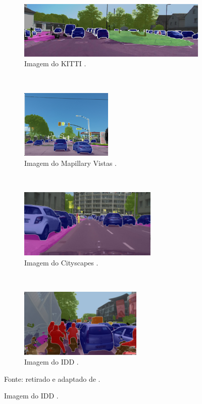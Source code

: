 \begin{figure}[H]
   \caption{Imagens de conjuntos de dados de segmentação panóptica.}
   \centering
   \label{panoptic:fig:3}
    \begin{subfigure}[t]{0.40\textwidth}
        \centering
        \includegraphics[width=1\linewidth]{recursos/imagens/panoptic/kitti.jpg}
        \caption{Imagem do KITTI \cite{Geiger2013}.}
        \label{panoptic:fig:3.1}
    \end{subfigure}%
    ~ 
    \begin{subfigure}[t]{0.50\textwidth}
        \centering
        \includegraphics[height=1.3in]{recursos/imagens/panoptic/vistas.jpg}
        \caption{Imagem do Mapillary Vistas \cite{Neuhold2017_ICCV}.}
        \label{panoptic:fig:3.2}
    \end{subfigure}%
    ~ 
    
    \begin{subfigure}[t]{0.45\textwidth}
        \centering
        \includegraphics[height=1.3in]{recursos/imagens/panoptic/cityscapes.jpg}
        \caption{Imagem do Cityscapes \cite{Cordts2016}.}
        \label{panoptic:fig:3.3}
    \end{subfigure}
    ~
    \begin{subfigure}[t]{0.45\textwidth}
        \centering
        \includegraphics[height=1.3in]{recursos/imagens/panoptic/idd.jpg}
        \caption{Imagem do IDD \cite{Varma2018}.}
        \label{panoptic:fig:3.4}
    \end{subfigure}

    \vspace*{1 cm}
    Fonte: retirado e adaptado de \cite{Mohan2020}.
\end{figure}


